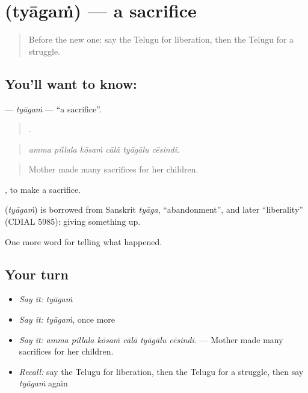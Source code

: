 \section[\texorpdfstring{\te{త్యాగం} (tyāgaṁ)}{త్యాగం (tyāgaṁ)}]{ (tyāgaṁ) — a sacrifice}

\label{lesson:TE-C364-tyagam}



\begin{quote}
Before the new one: say the Telugu for liberation, then the Telugu for a struggle.
\end{quote}

\subsection*{You'll want to know: }
\textbf{} — \emph{tyāgaṁ} — \textquotedblleft{}a sacrifice\textquotedblright{}.

\begin{quote}
     .
\end{quote}

\begin{quote}
\emph{amma pillala kōsaṁ cālā tyāgālu cēsindi.}
\end{quote}

\begin{quote}
Mother made many sacrifices for her children.
\end{quote}

 , to make a sacrifice.

\begin{cousinweb}
\textbf{} (\emph{tyāgaṁ}) is borrowed from Sanskrit \emph{tyāga}, \textquotedblleft{}abandonment\textquotedblright{}, and later \textquotedblleft{}liberality\textquotedblright{} (CDIAL 5985): giving something up.
\end{cousinweb}

\begin{grammarlens}[title={What you've built}]
One more word for telling what happened.
\end{grammarlens}

\subsection*{Your turn}
\begin{itemize}
\raggedright
  \item \emph{Say it:} \emph{tyāgaṁ}
  \item \emph{Say it:} \emph{tyāgaṁ}, once more
  \item \emph{Say it:} \emph{amma pillala kōsaṁ cālā tyāgālu cēsindi.} — Mother made many sacrifices for her children.
  \item \emph{Recall:} say the Telugu for liberation, then the Telugu for a struggle, then say \emph{tyāgaṁ} again
\end{itemize}

